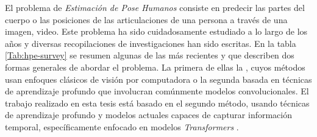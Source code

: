 El problema de \textit{Estimación de Pose Humanos} consiste en predecir las partes del cuerpo o las
posiciones de las articulaciones de una persona a través de una imagen, video. Este problema ha sido
cuidadosamente estudiado a lo largo de los años y diversas recopilaciones de investigaciones han sido escritas.
En la tabla \ref{Tab:hpe-survey} se resumen algunas de las más recientes y que describen dos formas
generales de abordar el problema. La primera de ellas la , cuyos métodos
usan enfoques clásicos de visión por computadora o la segunda basada en técnicas de aprendizaje
profundo que involucran comúnmente modelos convolucionales. El trabajo realizado en esta tesis está
basado en el segundo método, usando técnicas de aprendizaje profundo y modelos actuales capaces
de capturar información temporal, específicamente enfocado en modelos \textit{Transformers} \cite{Vaswani}.

